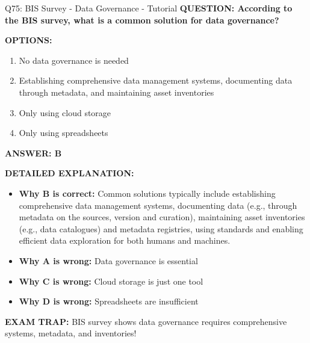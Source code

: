 \documentclass[8pt]{beamer}
\begin{document}
	\begin{frame}{Q75: BIS Survey - Data Governance - Tutorial}
		\fontsize{6.5}{7.5}\selectfont
		\textbf{QUESTION: According to the BIS survey, what is a common solution for data governance?}
		
		\vspace{0.1cm}
		\textbf{OPTIONS:}
		\begin{enumerate}
			\item No data governance is needed
			\item Establishing comprehensive data management systems, documenting data through metadata, and maintaining asset inventories
			\item Only using cloud storage
			\item Only using spreadsheets
		\end{enumerate}
		
		\vspace{0.1cm}
		\textcolor{myblue}{\textbf{ANSWER: B}}
		
		\vspace{0.1cm}
		\textbf{DETAILED EXPLANATION:}
		\begin{itemize}
			\item \textbf{Why B is correct:} Common solutions typically include establishing comprehensive data management systems, documenting data (e.g., through metadata on the sources, version and curation), maintaining asset inventories (e.g., data catalogues) and metadata registries, using standards and enabling efficient data exploration for both humans and machines.
			\item \textbf{Why A is wrong:} Data governance is essential
			\item \textbf{Why C is wrong:} Cloud storage is just one tool
			\item \textbf{Why D is wrong:} Spreadsheets are insufficient
		\end{itemize}
		
		\textcolor{myred}{\textbf{EXAM TRAP:}} BIS survey shows data governance requires \textcolor{myblue}{comprehensive systems, metadata, and inventories}!
	\end{frame}
	
	
\end{document}
